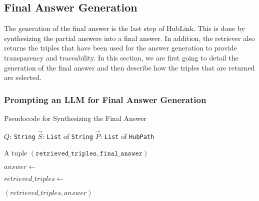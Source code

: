 \subsection{Final Answer Generation}

The generation of the final answer is the last step of HubLink. This is done by synthesizing the partial answers into a final answer. In addition, the retriever also returns the triples that have been used for the answer generation to provide transparency and traceability. In this section, we are first going to detail the generation of the final answer and then describe how the triples that are returned are selected.

\subsubsection{Prompting an LLM for Final Answer Generation}
\label{sec:prompting_an_llm_for_final_answer_generation}

\begin{algorithm}[t]
\caption{Pseudocode for Synthesizing the Final Answer}
\label{alg:get_final_answer}
\begin{algorithmic}[1]

\Require
    \Statex $Q$: \texttt{String} 
    \Statex $\vec{S}$: \texttt{List} of \texttt{String} 
    \Statex $\vec{P}$: \texttt{List} of \texttt{HubPath} 

\Ensure
    \Statex A tuple \((\texttt{retrieved\_triples}, \texttt{final\_answer})\)

\Statex
{}
    \State $answer \gets$  
    
    \State $retrieved\_triples \gets$ 

    \State \Return $(retrieved\_triples, answer)$
\EndFunction

\end{algorithmic}
\end{algorithm}

